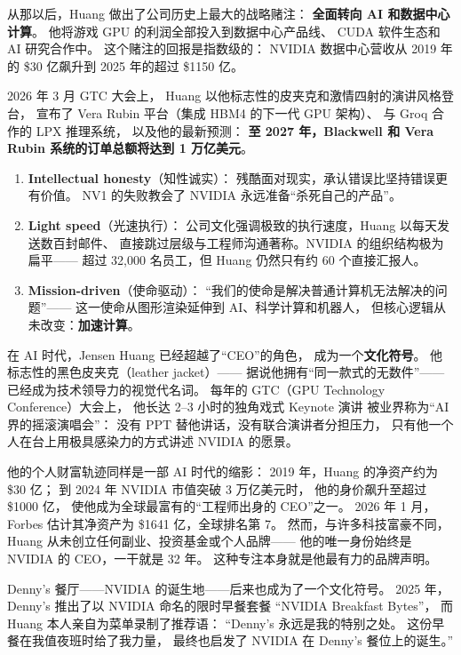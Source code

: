 从那以后，Huang 做出了公司历史上最大的战略赌注：
\textbf{全面转向 AI 和数据中心计算}。
他将游戏 GPU 的利润全部投入到数据中心产品线、
CUDA 软件生态和 AI 研究合作中。
这个赌注的回报是指数级的：
NVIDIA 数据中心营收从 2019 年的 \$30 亿飙升到 2025 年的超过 \$1150 亿。

2026 年 3 月 GTC 大会上，
Huang 以他标志性的皮夹克和激情四射的演讲风格登台，
宣布了 Vera Rubin 平台（集成 HBM4 的下一代 GPU 架构）、
与 Groq 合作的 LPX 推理系统，
以及他的最新预测：
\textbf{至 2027 年，Blackwell 和 Vera Rubin 系统的订单总额将达到 1 万亿美元}。

\begin{corebox}
\begin{enumerate}[noitemsep]
  \item \textbf{Intellectual honesty}（知性诚实）：
        残酷面对现实，承认错误比坚持错误更有价值。
        NV1 的失败教会了 NVIDIA 永远准备``杀死自己的产品''。
  \item \textbf{Light speed}（光速执行）：
        公司文化强调极致的执行速度，Huang 以每天发送数百封邮件、
        直接跳过层级与工程师沟通著称。NVIDIA 的组织结构极为扁平——
        超过 32,000 名员工，但 Huang 仍然只有约 60 个直接汇报人。
  \item \textbf{Mission-driven}（使命驱动）：
        ``我们的使命是解决普通计算机无法解决的问题''——
        这一使命从图形渲染延伸到 AI、科学计算和机器人，
        但核心逻辑从未改变：\textbf{加速计算}。
\end{enumerate}
\end{corebox}

\begin{whybox}
在 AI 时代，Jensen Huang 已经超越了``CEO''的角色，
成为一个\textbf{文化符号}。
他标志性的黑色皮夹克（leather jacket）——
据说他拥有``同一款式的无数件''——已经成为技术领导力的视觉代名词。
每年的 GTC（GPU Technology Conference）大会上，
他长达 2--3 小时的独角戏式 Keynote 演讲
被业界称为``AI 界的摇滚演唱会''：
没有 PPT 替他讲话，没有联合演讲者分担压力，
只有他一个人在台上用极具感染力的方式讲述 NVIDIA 的愿景。

他的个人财富轨迹同样是一部 AI 时代的缩影：
2019 年，Huang 的净资产约为 \$30 亿；
到 2024 年 NVIDIA 市值突破 3 万亿美元时，
他的身价飙升至超过 \$1000 亿，
使他成为全球最富有的``工程师出身的 CEO''之一。
2026 年 1 月，Forbes 估计其净资产为 \$1641 亿，全球排名第 7。
然而，与许多科技富豪不同，
Huang 从未创立任何副业、投资基金或个人品牌——
他的唯一身份始终是 NVIDIA 的 CEO，一干就是 32 年。
这种专注本身就是他最有力的品牌声明。

Denny's 餐厅——NVIDIA 的诞生地——后来也成为了一个文化符号。
2025 年，Denny's 推出了以 NVIDIA 命名的限时早餐套餐
``NVIDIA Breakfast Bytes''，
而 Huang 本人亲自为菜单录制了推荐语：
``Denny's 永远是我的特别之处。
这份早餐在我值夜班时给了我力量，
最终也启发了 NVIDIA 在 Denny's 餐位上的诞生。''
\end{whybox}

